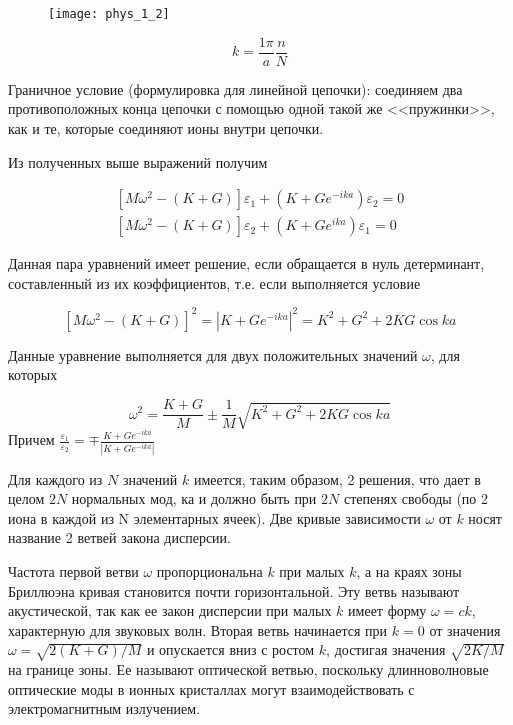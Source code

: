 \begin{figure}[h!]
    \begin{center}
        \texttt{[image: phys\_1\_2]}
    \end{center}
\end{figure}


\begin{equation}
    k=\frac{1\pi}{a} \frac{n}{N}
\end{equation}

Граничное условие (формулировка для линейной цепочки): соединяем два противоположных конца цепочки с помощью одной такой же <<пружинки>>, как и те, которые соединяют ионы внутри цепочки. 

Из полученных выше выражений получим 

\begin{equation}
    \begin{gathered}
    {\left[M \omega^2-(K+G)\right] \varepsilon_1+\left(K+G e^{-i k a}\right) \varepsilon_2=0} \\
    {\left[M \omega^2-(K+G)\right] \varepsilon_2+\left(K+G e^{i k a}\right) \varepsilon_1=0}
    \end{gathered}
\end{equation}

Данная пара уравнений имеет решение, если обращается в нуль детерминант, составленный из их коэффициентов, т.е. если выполняется условие 

\begin{equation}
    \left[M \omega^2-(K+G)\right]^2=\left|K+G e^{-i k a}\right|^2=K^2+G^2+2 K G \cos k a
\end{equation}

Данные уравнение выполняется для двух положительных значений $\omega$, для которых 

\begin{equation}
    \omega^2=\frac{K+G}{M} \pm \frac{1}{M} \sqrt{K^2+G^2+2 K G \cos k a}
\end{equation}
Причем $\displaystyle \frac{\varepsilon_1}{\varepsilon_2}=\mp \frac{K+G e^{-i k a}}{\left|K+G e^{-i k a}\right|}$

Для каждого из $N$ значений $k$ имеется, таким образом, 2 решения, что дает в целом $2N$ нормальных мод, ка и должно быть при $2N$ степенях свободы (по 2 иона в каждой из N элементарных ячеек). Две кривые зависимости $\omega$ от $k$ носят название 2 ветвей закона дисперсии.

Частота первой ветви $\omega$ пропорциональна $k$ при малых $k$, а на краях зоны Бриллюэна кривая становится почти горизонтальной. Эту ветвь называют акустической, так как ее закон дисперсии при малых $k$ имеет форму $\omega=ck$, характерную для звуковых волн. Вторая ветвь начинается при $k=0$ от значения  $\omega = \sqrt{2(K+G)/M}$ и опускается вниз с ростом $k$, достигая значения $\sqrt{2K/M}$ на границе зоны. Ее называют оптической ветвью, поскольку длинноволновые оптические моды в ионных кристаллах могут взаимодействовать с электромагнитным излучением. 

